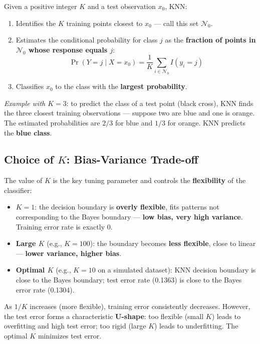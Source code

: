 \documentclass[11pt,a4paper]{article}
\theoremstyle{definition}
\theoremstyle{plain}
\theoremstyle{remark}
\begin{document}
\begin{tcolorbox}[colback=blue!5!white,colframe=blue!75!black,title=\textbf{KNN Algorithm}]
Given a positive integer $K$ and a test observation $x_0$, KNN:
\begin{enumerate}
    \item Identifies the $K$ training points closest to $x_0$ — call this set $\mathcal{N}_0$.
    \item Estimates the conditional probability for class $j$ as the \textbf{fraction of points in $\mathcal{N}_0$ whose response equals $j$}:
    \[
        \Pr(Y = j \mid X = x_0) = \frac{1}{K} \sum_{i \in \mathcal{N}_0} I(y_i = j)
    \]
    \item Classifies $x_0$ to the class with the \textbf{largest probability}.
\end{enumerate}
\end{tcolorbox}

\textit{Example with $K = 3$}: to predict the class of a test point (black cross), KNN finds the three closest training observations — suppose two are blue and one is orange. The estimated probabilities are $2/3$ for blue and $1/3$ for orange. KNN predicts the \textbf{blue class}.

\subsection{Choice of $K$: Bias-Variance Trade-off}

The value of $K$ is the key tuning parameter and controls the \textbf{flexibility} of the classifier:

\begin{itemize}
    \item \textbf{$K = 1$}: the decision boundary is \textbf{overly flexible}, fits patterns not corresponding to the Bayes boundary — \textbf{low bias, very high variance}. Training error rate is exactly 0.
    \item \textbf{Large $K$} (e.g., $K = 100$): the boundary becomes \textbf{less flexible}, close to linear — \textbf{lower variance, higher bias}.
    \item \textbf{Optimal $K$} (e.g., $K = 10$ on a simulated dataset): KNN decision boundary is close to the Bayes boundary; test error rate (0.1363) is close to the Bayes error rate (0.1304).
\end{itemize}

\begin{tcolorbox}[colback=blue!5!white,colframe=blue!75!black,title=\textbf{Flexibility and Error in KNN}]
As $1/K$ increases (more flexible), training error consistently decreases. However, the test error forms a characteristic \textbf{U-shape}: too flexible (small $K$) leads to overfitting and high test error; too rigid (large $K$) leads to underfitting. The optimal $K$ minimizes test error.
\end{tcolorbox}
\end{document}
